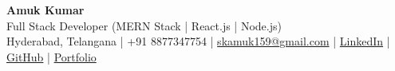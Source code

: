\begin{center}
    {\Huge \textbf{Amuk Kumar}} \\[4pt]
    {\small Full Stack Developer (MERN Stack | React.js | Node.js)} \\[6pt]
    {\footnotesize
    Hyderabad, Telangana \;|\;
    +91 8877347754 \;|\;
    \href{mailto:skamuk159@gmail.com}{skamuk159@gmail.com} \;|\;
    \href{https://www.linkedin.com/in/amukkumar}{LinkedIn} \;|\;
    \href{https://github.com/amukkumar}{GitHub} \;|\;
    \href{https://amukkumar.com}{Portfolio}
    }
\end{center}
